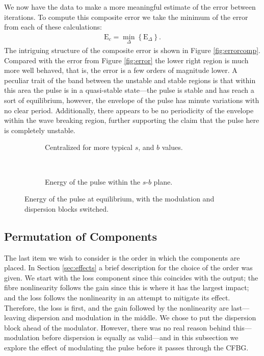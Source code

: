 We now have the data to make a more meaningful estimate of the error between iterations. To compute this composite error we take the minimum of the error from each of these calculations:
\begin{align}
\textrm{E}_c = \min_\Delta \left\{ \textrm{E}_\Delta \right\}.
\label{eq:errorcomp}
\end{align}
The intriguing structure of the composite error is shown in Figure \ref{fig:errorcomp}. Compared with the error from Figure \ref{fig:error} the lower right region is much more well behaved, that is, the error is a few orders of magnitude lower. A peculiar trait of the band between the unstable and stable regions is that within this area the pulse is in a quasi-stable state---the pulse is stable and has reach a sort of equilibrium, however, the envelope of the pulse has minute variations with no clear period. Additionally, there appears to be no periodicity of the envelope within the wave breaking region, further supporting the claim that the pulse here is completely unstable. \\

\begin{figure}[p]
\centering
\begin{subfigure}{\textwidth}

\caption{Centralized for more typical $s$, and $b$ values.}
\label{fig:switchzoom}
\end{subfigure} \\
\begin{subfigure}{\textwidth}

\caption{Energy of the pulse within the $s$-$b$ plane.}
\label{fig:switchbig}
\end{subfigure}
\caption{Energy of the pulse at equilibrium, with the modulation and dispersion blocks switched.}
\label{fig:switch}
\end{figure}

\subsection{Permutation of Components}
The last item we wish to consider is the order in which the components are placed. In Section \ref{sec:effects} a brief description for the choice of the order was given. We start with the loss component since this coincides with the output; the fibre nonlinearity follows the gain since this is where it has the largest impact; and the loss follows the nonlinearity in an attempt to mitigate its effect. Therefore, the loss is first, and the gain followed by the nonlinearity are last---leaving dispersion and modulation in the middle. We chose to put the dispersion block ahead of the modulator. However, there was no real reason behind this---modulation before dispersion is equally as valid---and in this subsection we explore the effect of modulating the pulse before it passes through the CFBG. \\

